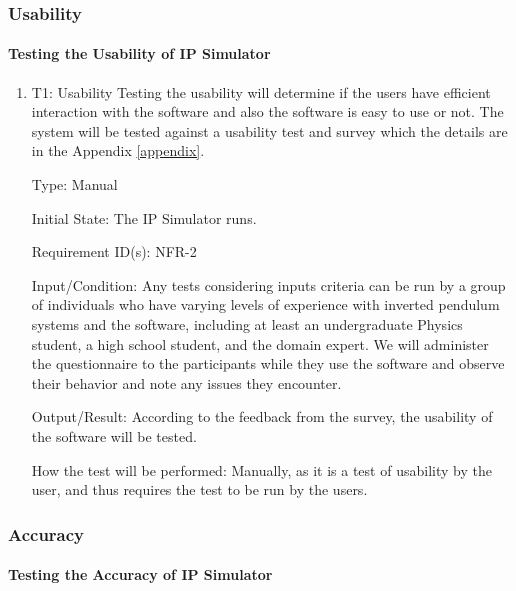 \documentclass[12pt, titlepage]{article}
\begin{document}
\subsubsection{Usability\label{nfr2}}

\paragraph{Testing the Usability of IP Simulator}

\begin{enumerate}

\item{T1: Usability}
\vspace{3mm}
\newline
Testing the usability will determine if the users have efficient interaction with the software and also the software is easy to use or not. The system will be tested against a usability test and survey which the details are in the Appendix \ref{appendix}.

Type: Manual
					
Initial State: The IP Simulator runs. 

Requirement ID(s): NFR-2			

Input/Condition: Any tests considering inputs criteria can be run by a group of individuals who have varying levels of experience with inverted pendulum systems and the software, including at least an undergraduate Physics student, a high school student, and the domain expert.
We will administer the questionnaire to the participants while they use the software and observe their behavior and note any issues they encounter.

Output/Result: According to the feedback from the survey, the usability of the software will be tested.

How the test will be performed: Manually, as it is a test of usability by the user, and thus requires the test to be run by the users.

\end{enumerate}				

\subsubsection{Accuracy\label{nfr3}}

\paragraph{Testing the Accuracy of IP Simulator}
\end{document}
